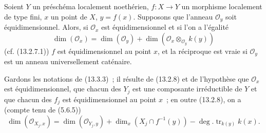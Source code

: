 \begin{proposition}[13.3.6]
\label{IV.13.3.6-fr}
Soient $Y$ un préschéma localement noethérien, $f:X\to Y$ un morphisme
localement de type fini, $x$ un point de $X$, $y=f(x)$. Supposons que l'anneau
$\mathcal O_y$ soit équidimensionnel. Alors, si $\mathcal O_x$ est
équidimensionnel et si l'on a l'égalité
\[
\tag{13.3.6.1}
\label{IV.13.3.6.1-fr}
  \dim(\mathcal O_x)=\dim(\mathcal O_y)
  +\dim(\mathcal O_x\otimes_{\mathcal O_y}k(y))
\]
(cf. (13.2.7.1)) $f$ est équidimensionnel au point $x$, et la réciproque est
vraie si $\mathcal O_y$ est un anneau universellement caténaire.
\end{proposition}

Gardons les notations de (13.3.3)~; il résulte de (13.2.8) et de l'hypothèse
que $\mathcal O_x$ est équidimensionnel, que chacun des $Y_j$ est une
composante irréductible de $Y$ et que chacun des $f_j$ est équidimensionnel au
point $x$~; en outre (13.2.8), on a (compte tenu de (5.6.5))
\[
  \dim(\mathcal O_{X_j,x})=\dim(\mathcal O_{Y_j,y})
  +\dim_x(X_j\cap f^{-1}(y))-\deg.\operatorname{tr}_{k(y)}k(x).
\]

